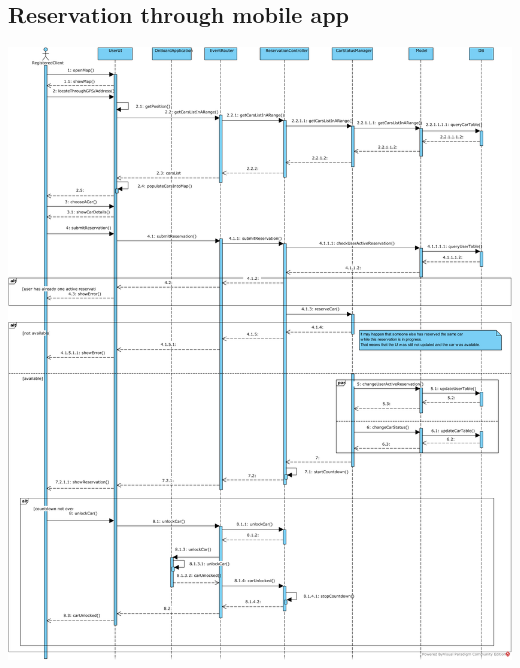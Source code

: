 \subsection{Reservation through mobile app}
\includegraphics[width=\textwidth, keepaspectratio]{../images/architectural_design/rv_reservation.png}

